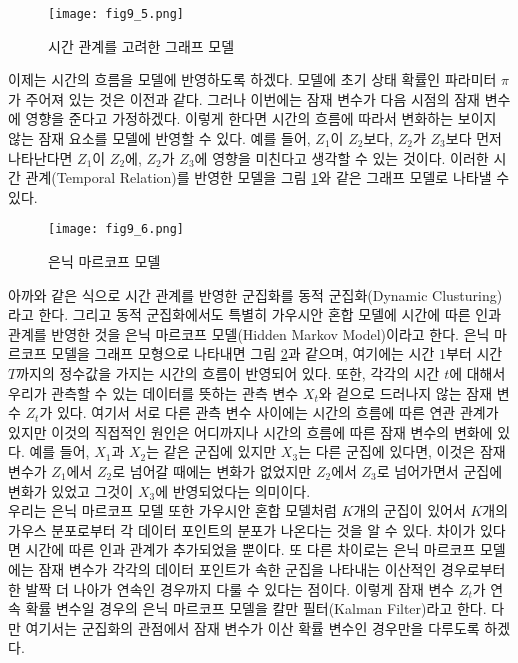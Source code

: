 \documentclass[a4paper]{oblivoir}
\begin{document}
\begin{figure}[ht] \centering 
\texttt{[image: fig9\_5.png]} 
\caption{시간 관계를 고려한 그래프 모델}
\label{fig:9-5}
\end{figure}

이제는 시간의 흐름을 모델에 반영하도록 하겠다. 모델에 초기 상태 확률인 파라미터 $\pi$가 주어져 있는 것은 이전과 같다. 그러나 이번에는 잠재 변수가 다음 시점의 잠재 변수에 영향을 준다고 가정하겠다. 이렇게 한다면 시간의 흐름에 따라서 변화하는 보이지 않는 잠재 요소를 모델에 반영할 수 있다. 예를 들어, $Z_1$이 $Z_2$보다, $Z_2$가 $Z_3$보다 먼저 나타난다면 $Z_1$이 $Z_2$에, $Z_2$가 $Z_3$에 영향을 미친다고 생각할 수 있는 것이다. 이러한 시간 관계(Temporal Relation)를 반영한 모델을 그림 \ref{fig:9-5}와 같은 그래프 모델로 나타낼 수 있다.  \\

\begin{figure}[ht] \centering 
\texttt{[image: fig9\_6.png]} 
\caption{은닉 마르코프 모델}
\label{fig:9-6}
\end{figure}

아까와 같은 식으로 시간 관계를 반영한 군집화를 동적 군집화(Dynamic Clusturing)라고 한다. 그리고 동적 군집화에서도 특별히 가우시안 혼합 모델에 시간에 따른 인과 관계를 반영한 것을 은닉 마르코프 모델(Hidden Markov Model)이라고 한다. 은닉 마르코프 모델을 그래프 모형으로 나타내면 그림 \ref{fig:9-6}과 같으며, 여기에는 시간 $1$부터 시간 $T$까지의 정수값을 가지는 시간의 흐름이 반영되어 있다. 또한, 각각의 시간 $t$에 대해서 우리가 관측할 수 있는 데이터를 뜻하는 관측 변수 $X_t$와 겉으로 드러나지 않는 잠재 변수 $Z_t$가 있다. 여기서 서로 다른 관측 변수 사이에는 시간의 흐름에 따른 연관 관계가 있지만 이것의 직접적인 원인은 어디까지나 시간의 흐름에 따른 잠재 변수의 변화에 있다. 예를 들어, $X_1$과 $X_2$는 같은 군집에 있지만 $X_3$는 다른 군집에 있다면, 이것은 잠재 변수가 $Z_1$에서 $Z_2$로 넘어갈 때에는 변화가 없었지만 $Z_2$에서 $Z_3$로 넘어가면서 군집에 변화가 있었고 그것이 $X_3$에 반영되었다는 의미이다. \\

우리는 은닉 마르코프 모델 또한 가우시안 혼합 모델처럼 $K$개의 군집이 있어서 $K$개의 가우스 분포로부터 각 데이터 포인트의 분포가 나온다는 것을 알 수 있다. 차이가 있다면 시간에 따른 인과 관계가 추가되었을 뿐이다. 또 다른 차이로는 은닉 마르코프 모델에는 잠재 변수가 각각의 데이터 포인트가 속한 군집을 나타내는 이산적인 경우로부터 한 발짝 더 나아가 연속인 경우까지 다룰 수 있다는 점이다. 이렇게 잠재 변수 $Z_t$가 연속 확률 변수일 경우의 은닉 마르코프 모델을 칼만 필터(Kalman Filter)라고 한다. 다만 여기서는 군집화의 관점에서 잠재 변수가 이산 확률 변수인 경우만을 다루도록 하겠다. \\
\end{document}
